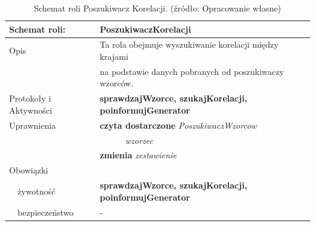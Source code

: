 \documentclass[11pt]{report}
\begin{document}
    \begin{table}[ht!]
        \begin{tabular}{ll}
            Schemat roli:          & PoszukiwaczKorelacji                                           \\ \hline
            Opis                   & Ta rola obejmuje wyszukiwanie korelacji między krajami         \\
            & na podstawie danych pobranych od poszukiwaczy wzorców.         \\
            Protokoły i Aktywności & \textbf{sprawdzajWzorce, szukajKorelacji, poinformujGenerator} \\
            Uprawnienia            & \textbf{czyta dostarczone} \textit{PoszukiwaczWzorcow}         \\
            & ~~~~~~\textit{wzorzec}                                         \\
            & \textbf{zmienia} \textit{zestawienie}                          \\
            Obowiązki              &                                                                \\
            ~~żywotność            & \textbf{sprawdzajWzorce, szukajKorelacji, poinformujGenerator} \\
            ~~bezpieczeństwo       & -                                                              \\
        \end{tabular}
        \caption{Schemat roli Poszukiwacz Korelacji. (źródło: Opracowanie własne)}
        \label{tab:schemat roli poszukiwacz korelacji}
    \end{table}
\end{document}
